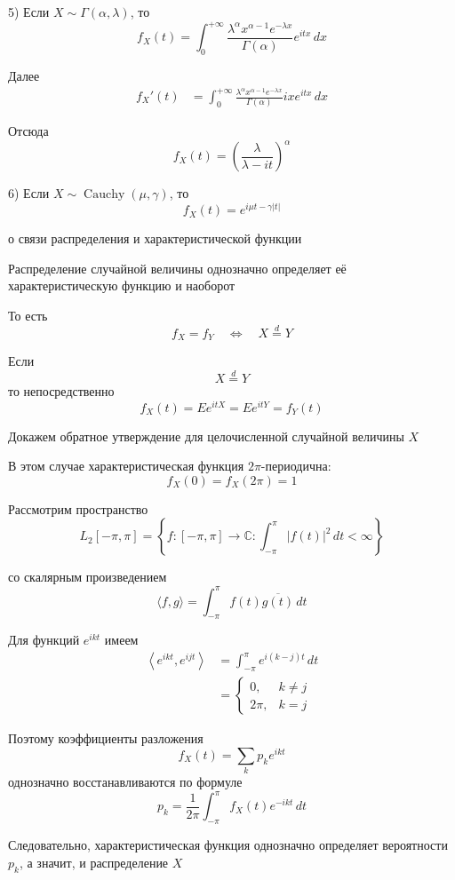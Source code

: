 \documentclass[12pt,a4paper]{article}
\begin{document}
\begin{example}
\bigskip

5) Если $X\sim\Gamma(\alpha,\lambda)$, то
\[
f_X(t)
=
\int_0^{+\infty}
\frac{\lambda^\alpha x^{\alpha-1}e^{-\lambda x}}
{\Gamma(\alpha)}
e^{itx}\,dx
\]

Далее
\[
\begin{aligned}
f_X'(t)
&=
\int_0^{+\infty}
\frac{\lambda^\alpha x^{\alpha-1}e^{-\lambda x}}
{\Gamma(\alpha)}
ixe^{itx}\,dx
\end{aligned}
\]

Отсюда
\[
f_X(t)
=
\left(
\frac{\lambda}{\lambda-it}
\right)^\alpha
\]

\bigskip

6) Если $X\sim\operatorname{Cauchy}(\mu,\gamma)$, то
\[
f_X(t)
=
e^{i\mu t-\gamma|t|}
\]

\end{example}

\begin{theorem}{о связи распределения и характеристической функции}

Распределение случайной величины однозначно определяет её характеристическую функцию и наоборот

То есть
\[
f_X=f_Y
\quad\Longleftrightarrow\quad
X\overset{d}{=}Y
\]

\end{theorem}

\begin{proofbox}{}

Если
\[
X\overset{d}{=}Y
\]
то непосредственно
\[
f_X(t)
=
Ee^{itX}
=
Ee^{itY}
=
f_Y(t)
\]

Докажем обратное утверждение для целочисленной случайной величины $X$

В этом случае характеристическая функция $2\pi$-периодична:
\[
f_X(0) = f_X(2\pi) = 1
\]

Рассмотрим пространство
\[
L_2[-\pi,\pi]
=
\left\{
f:[-\pi,\pi]\to\mathbb{C}:
\int_{-\pi}^{\pi}|f(t)|^2\,dt<\infty
\right\}
\]

со скалярным произведением
\[
\langle f,g\rangle
=
\int_{-\pi}^{\pi}
f(t)\overline{g(t)}\,dt
\]

Для функций $e^{ikt}$ имеем
\[
\begin{aligned}
\left\langle e^{ikt},e^{ijt}\right\rangle
&=
\int_{-\pi}^{\pi}
e^{i(k-j)t}\,dt\\
&=
\begin{cases}
0, & k\neq j\\
2\pi, & k=j
\end{cases}
\end{aligned}
\]

Поэтому коэффициенты разложения
\[
f_X(t)
=
\sum_k p_ke^{ikt}
\]
однозначно восстанавливаются по формуле
\[
p_k
=
\frac{1}{2\pi}
\int_{-\pi}^{\pi}
f_X(t)e^{-ikt}\,dt
\]

Следовательно, характеристическая функция однозначно определяет вероятности $p_k$, а значит, и распределение $X$

\end{proofbox}
\end{document}
